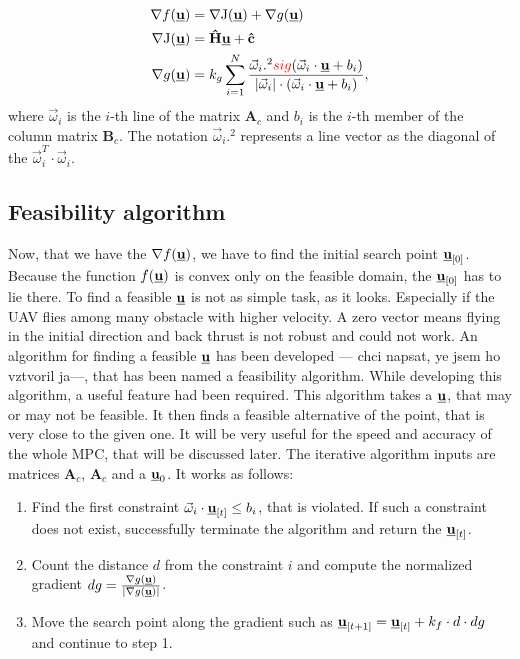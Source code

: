 \documentclass[a4paper,11pt,titlepage]{article}
\newcommand{\uvec}{\textbf{\underline{u}}}
\newcommand{\macJ}{\mathrm{J}(\uvec)}
\newcommand{\macf}{f(\uvec)}
\newcommand{\macg}{g(\uvec)}
\newcommand{\macoi}{\vec{\omega}_i}
\begin{document}
\begin{equation}
\begin{split}
\nabla \macf &= \nabla \macJ + \nabla \macg\\
\nabla\macJ &= \textbf{\^H}\uvec + \textbf{\^c}\\
\nabla \macg &= k_g\sum_{i = 1}^N
\frac{\macoi.^2\textcolor{red}{sig}(\macoi\cdot\uvec+b_i)}
{|\macoi|\cdot(\macoi \cdot \uvec + b_i)},
\end{split}
\end{equation}
where $\macoi$ is the $i$-th line of the matrix $\textbf{A}_c$ and $b_i$ is the $i$-th member of the column matrix $\textbf{B}_c$. The notation $\macoi.^2$ represents a line vector as the diagonal of the $\macoi^T \cdot \macoi$. 

\subsection{Feasibility algorithm}
Now, that we have the $\nabla \macf$, we have to find the initial search point $\uvec_{[0]}$. Because the function $\macf$ is convex only on the feasible domain, the $\uvec_{[0]}$ has to lie there. To find a feasible $\uvec$ is not as simple task, as it looks. Especially if the UAV flies among many obstacle with higher velocity. A zero vector means flying in the initial direction and back thrust is not robust and could not work. An algorithm for finding a feasible $\uvec$ has been developed --- chci napsat, ye jsem ho vztvoril ja---, that has been named a feasibility algorithm. While developing this algorithm, a useful feature had been required. This algorithm takes a $\uvec$, that may or may not be feasible. It then finds a feasible alternative of the point, that is very close to the given one. It will be very useful for the speed and accuracy of the whole MPC, that will be discussed later. The iterative algorithm inputs are matrices $\textbf{A}_c$, $\textbf{A}_c$ and a $\uvec_0$. It works as follows:

\begin{enumerate}
\item Find the first constraint $\macoi \cdot \uvec_{[t]} \leq b_i$, that is violated. If such a constraint does not exist, successfully terminate the algorithm and return the $\uvec_{[t]}$.

\item Count the distance $d$ from the constraint $i$ and compute the normalized gradient $dg = \frac{\nabla \macg}{|\nabla \macg|}$.

\item Move the search point along the gradient such as $\uvec_{[t+1]} = \uvec_{[t]} + k_f \cdot d \cdot dg$ and continue to step 1.
\end{enumerate}
\end{document}
